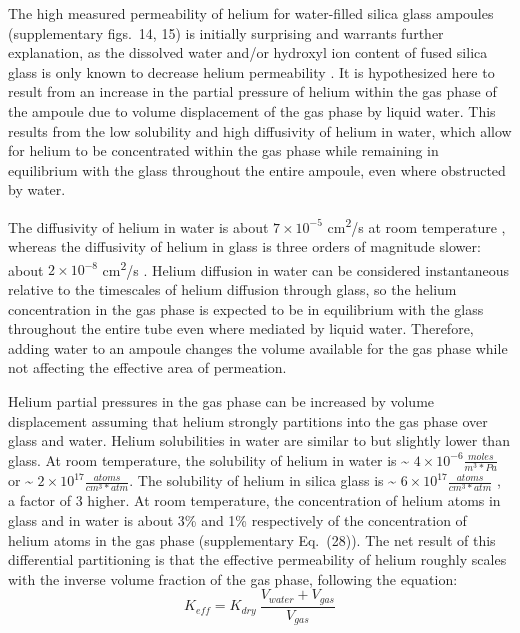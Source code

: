 The high measured permeability of helium for water-filled silica glass ampoules (supplementary figs.~14, 15) is initially surprising and warrants further explanation, as the dissolved water and/or hydroxyl ion content of fused silica glass is only known to decrease helium permeability \citep{tsuru2011,shelby1972,masaryk1968}. It is hypothesized here to result from an increase in the partial pressure of helium within the gas phase of the ampoule due to volume displacement of the gas phase by liquid water. This results from the low solubility and high diffusivity of helium in water, which allow for helium to be concentrated within the gas phase while remaining in equilibrium with the glass throughout the entire ampoule, even where obstructed by water.

The diffusivity of helium in water is about \(7 \times 10^{-5}\) cm\textsuperscript{2}/s at room temperature \citep{verhallen1984}, whereas the diffusivity of helium in glass is three orders of magnitude slower: about \(2 \times 10^{-8}\) cm\textsuperscript{2}/s \citep{swets1961}. Helium diffusion in water can be considered instantaneous relative to the timescales of helium diffusion through glass, so the helium concentration in the gas phase is expected to be in equilibrium with the glass throughout the entire tube even where mediated by liquid water. Therefore, adding water to an ampoule changes the volume available for the gas phase while not affecting the effective area of permeation.

Helium partial pressures in the gas phase can be increased by volume displacement assuming that helium strongly partitions into the gas phase over glass and water. Helium solubilities in water are similar to but slightly lower than glass. At room temperature, the solubility of helium in water is \textasciitilde{} \(4 \times 10^{- 6}\frac{moles}{m^{3}*Pa}\ \)\citep{sander2015} or \textasciitilde{} \(2 \times 10^{17}\frac{atoms}{{cm}^{3}*atm}\). The solubility of helium in silica glass is \textasciitilde{} \(6 \times 10^{17}\frac{atoms}{{cm}^{3}*atm}\) \citep{swets1961}, a factor of 3 higher. At room temperature, the concentration of helium atoms in glass and in water is about 3\% and 1\% respectively of the concentration of helium atoms in the gas phase (supplementary Eq.~(28)). The net result of this differential partitioning is that the effective permeability of helium roughly scales with the inverse volume fraction of the gas phase, following the equation: \begin{equation}
\label{eq:keff}
K_{eff} = K_{dry}\ \frac{V_{water} + V_{gas}}{V_{gas}}
\end{equation}

